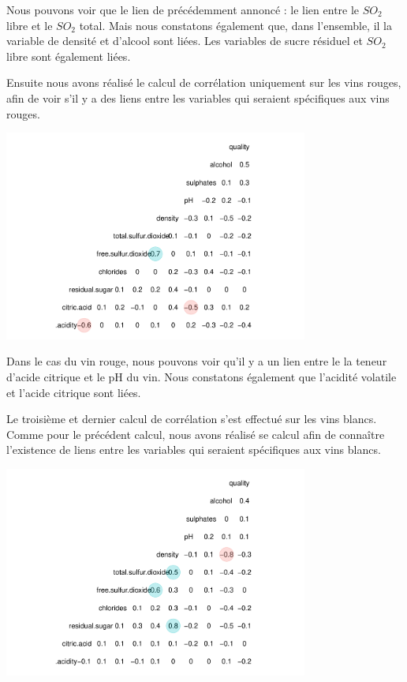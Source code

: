\documentclass[
]{article}
\begin{document}
Nous pouvons voir que le lien de précédemment annoncé : le lien entre le
\(SO_2\) libre et le \(SO_2\) total. Mais nous constatons également que,
dans l'ensemble, il la variable de densité et d'alcool sont liées. Les
variables de sucre résiduel et \(SO_2\) libre sont également liées.

Ensuite nous avons réalisé le calcul de corrélation uniquement sur les
vins rouges, afin de voir s'il y a des liens entre les variables qui
seraient spécifiques aux vins rouges.

\begin{center}
	\includegraphics[width=10cm]{repport_files/figure-latex/unnamed-chunk-2-1.pdf}
\end{center}

Dans le cas du vin rouge, nous pouvons voir qu'il y a un lien entre le
la teneur d'acide citrique et le pH du vin. Nous constatons également
que l'acidité volatile et l'acide citrique sont liées.

Le troisième et dernier calcul de corrélation s'est effectué sur les
vins blancs. Comme pour le précédent calcul, nous avons réalisé se
calcul afin de connaître l'existence de liens entre les variables qui
seraient spécifiques aux vins blancs.

\begin{center}
	\includegraphics[width=10cm]{repport_files/figure-latex/unnamed-chunk-3-1.pdf}
\end{center}
\end{document}
